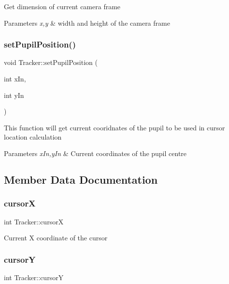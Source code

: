 Get dimension of current camera frame 
\begin{DoxyParams}{Parameters}
{\em x,y} & width and height of the camera frame \\
\hline
\end{DoxyParams}
\mbox{\label{class_tracker_a46d18bb34e13db3c607929611a397df2}} 
\subsubsection{\texorpdfstring{set\+Pupil\+Position()}{setPupilPosition()}}
{\footnotesize\ttfamily void Tracker\+::set\+Pupil\+Position (\begin{DoxyParamCaption}\item[{int}]{x\+In,  }\item[{int}]{y\+In }\end{DoxyParamCaption})}

This function will get current cooridnates of the pupil to be used in cursor location calculation 
\begin{DoxyParams}{Parameters}
{\em x\+In,y\+In} & Current coordinates of the pupil centre \\
\hline
\end{DoxyParams}


\subsection{Member Data Documentation}
\mbox{\label{class_tracker_ae1b2c9361fa21a9736c7ae958d663315}} 
\subsubsection{\texorpdfstring{cursorX}{cursorX}}
{\footnotesize\ttfamily int Tracker\+::cursorX\hspace{0.3cm}{\ttfamily [private]}}

Current X coordinate of the cursor \mbox{\label{class_tracker_aa4d4bd44e62ea5012119e6d72d6143f5}} 
\subsubsection{\texorpdfstring{cursorY}{cursorY}}
{\footnotesize\ttfamily int Tracker\+::cursorY\hspace{0.3cm}{\ttfamily [private]}}

